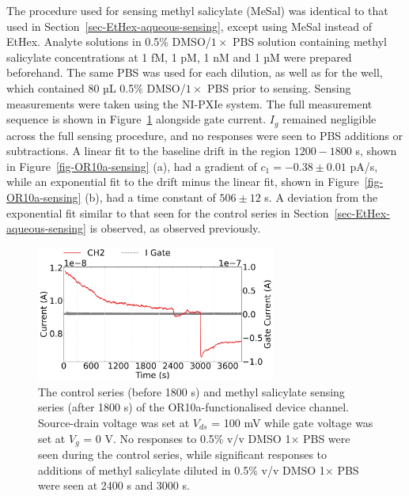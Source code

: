 \documentclass[
  a4paper,
]{scrbook}
\begin{document}
The procedure used for sensing methyl salicylate (MeSal) was identical
to that used in Section~\ref{sec-EtHex-aqueous-sensing}, except using
MeSal instead of EtHex. Analyte solutions in 0.5\% DMSO/\(1 \times\) PBS
solution containing methyl salicylate concentrations at 1 fM, 1 pM, 1 nM
and 1 µM were prepared beforehand. The same PBS was used for each
dilution, as well as for the well, which contained 80 µL 0.5\%
DMSO/\(1 \times\) PBS prior to sensing. Sensing measurements were taken
using the NI-PXIe system. The full measurement sequence is shown in
Figure~\ref{fig-MeSal-sensing} alongside gate current. \(I_g\) remained
negligible across the full sensing procedure, and no responses were seen
to PBS additions or subtractions. A linear fit to the baseline drift in
the region \(1200-1800\) s, shown in Figure~\ref{fig-OR10a-sensing} (a),
had a gradient of \(c_1 = -0.38 \pm 0.01\) pA/s, while an exponential
fit to the drift minus the linear fit, shown in
Figure~\ref{fig-OR10a-sensing} (b), had a time constant of
\(506 \pm 12\) s. A deviation from the exponential fit similar to that
seen for the control series in Section~\ref{sec-EtHex-aqueous-sensing}
is observed, as observed previously.

\begin{figure}

{\centering \includegraphics[width=0.7\textwidth,height=\textheight]{figures/ch7/NTQ39C7_OR10avihis_MeSalsensing_240403.png}

}

\caption[The control series and methyl salicylate sensing series of the
OR10a-functionalised device channel.]{\label{fig-MeSal-sensing}The
control series (before 1800 s) and methyl salicylate sensing series
(after 1800 s) of the OR10a-functionalised device channel. Source-drain
voltage was set at \(V_{ds}\) = 100 mV while gate voltage was set at
\(V_g\) = 0 V. No responses to 0.5\% v/v DMSO 1× PBS were seen during
the control series, while significant responses to additions of methyl
salicylate diluted in 0.5\% v/v DMSO 1× PBS were seen at 2400 s and 3000
s.}

\end{figure}
\end{document}
